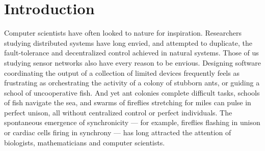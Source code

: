 \documentclass{sig-alternate}
\begin{document}










\section{Introduction}

Computer scientists have often looked to nature for inspiration.
Researchers studying distributed systems have long envied, and
attempted to duplicate, the fault-tolerance and decentralized control
achieved in natural systems.  Those of us studying sensor networks
also have every reason to be envious.  Designing software coordinating
the output of a collection of limited devices frequently feels as
frustrating as orchestrating the activity of a colony of stubborn
ants, or guiding a school of uncooperative fish.  And yet ant colonies
complete difficult tasks, schools of fish navigate the sea, and swarms
of fireflies stretching for miles can pulse in perfect unison, all
without centralized control or perfect individuals. The spontaneous
emergence of synchronicity --- for example, fireflies flashing in
unison or cardiac cells firing in synchrony --- has long attracted the
attention of biologists, mathematicians and computer scientists.
\end{document}
